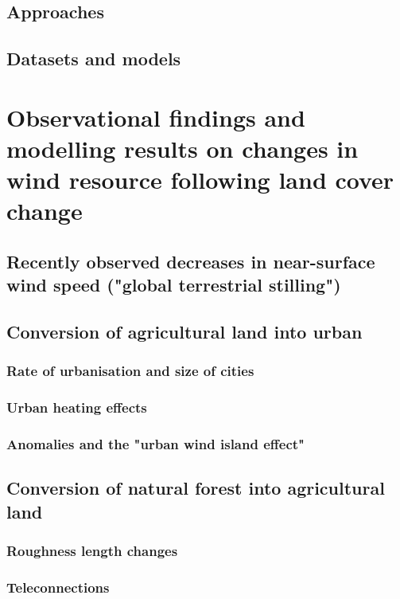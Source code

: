 \documentclass[12pt,a4paper,twoside]{book}
\begin{document}
\subsection{Approaches}

\subsection{Datasets and models}

\section{Observational findings and modelling results on changes in wind resource following land cover change}

\subsection{Recently observed decreases in near-surface wind speed ("global terrestrial stilling")}

\subsection{Conversion of agricultural land into urban}

\subsubsection{Rate of urbanisation and size of cities}

\subsubsection{Urban heating effects}

\subsubsection{Anomalies and the "urban wind island effect"}

\subsection{Conversion of natural forest into agricultural land}

\subsubsection{Roughness length changes}

\subsubsection{Teleconnections}
\end{document}
